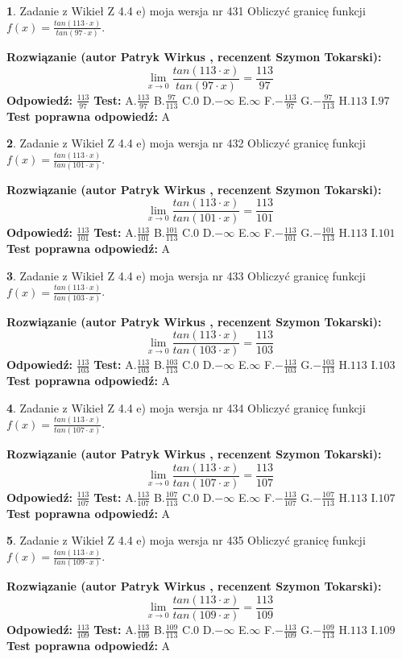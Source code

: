 \documentclass[12pt, a4paper]{article}
\theoremstyle{definition} %
\newtheorem{zad}{}
\newcommand{\zadStart}[1]{\begin{zad}#1\newline}
\newcommand{\zadStop}{\end{zad}}
\newcommand{\rozwStart}[2]{\noindent \textbf{Rozwiązanie (autor #1 , recenzent #2): }\newline}
\newcommand{\rozwStop}{\newline}
\newcommand{\odpStart}{\noindent \textbf{Odpowiedź:}\newline}
\newcommand{\odpStop}{\newline}
\newcommand{\testStart}{\noindent \textbf{Test:}\newline}
\newcommand{\testStop}{\newline}
\newcommand{\kluczStart}{\noindent \textbf{Test poprawna odpowiedź:}\newline}
\newcommand{\kluczStop}{\newline}
\begin{document}
\zadStart{Zadanie z Wikieł Z 4.4 e) moja wersja nr 431}
Obliczyć granicę funkcji $f(x)=\frac{tan(113\cdot x)}{tan(97\cdot x)}$.
\zadStop
\rozwStart{Patryk Wirkus}{Szymon Tokarski}
$$\lim\limits_{x\to 0}\frac{tan(113\cdot x)}{tan(97\cdot x)}=
\frac{113}{97}$$
\rozwStop
\odpStart
$\frac{113}{97}$
\odpStop
\testStart
A.$\frac{113}{97}$
B.$\frac{97}{113}$
C.$0$
D.$-\infty$
E.$\infty$
F.$-\frac{113}{97}$
G.$-\frac{97}{113}$
H.$113$
I.$97$
\testStop
\kluczStart
A
\kluczStop



\zadStart{Zadanie z Wikieł Z 4.4 e) moja wersja nr 432}
Obliczyć granicę funkcji $f(x)=\frac{tan(113\cdot x)}{tan(101\cdot x)}$.
\zadStop
\rozwStart{Patryk Wirkus}{Szymon Tokarski}
$$\lim\limits_{x\to 0}\frac{tan(113\cdot x)}{tan(101\cdot x)}=
\frac{113}{101}$$
\rozwStop
\odpStart
$\frac{113}{101}$
\odpStop
\testStart
A.$\frac{113}{101}$
B.$\frac{101}{113}$
C.$0$
D.$-\infty$
E.$\infty$
F.$-\frac{113}{101}$
G.$-\frac{101}{113}$
H.$113$
I.$101$
\testStop
\kluczStart
A
\kluczStop



\zadStart{Zadanie z Wikieł Z 4.4 e) moja wersja nr 433}
Obliczyć granicę funkcji $f(x)=\frac{tan(113\cdot x)}{tan(103\cdot x)}$.
\zadStop
\rozwStart{Patryk Wirkus}{Szymon Tokarski}
$$\lim\limits_{x\to 0}\frac{tan(113\cdot x)}{tan(103\cdot x)}=
\frac{113}{103}$$
\rozwStop
\odpStart
$\frac{113}{103}$
\odpStop
\testStart
A.$\frac{113}{103}$
B.$\frac{103}{113}$
C.$0$
D.$-\infty$
E.$\infty$
F.$-\frac{113}{103}$
G.$-\frac{103}{113}$
H.$113$
I.$103$
\testStop
\kluczStart
A
\kluczStop



\zadStart{Zadanie z Wikieł Z 4.4 e) moja wersja nr 434}
Obliczyć granicę funkcji $f(x)=\frac{tan(113\cdot x)}{tan(107\cdot x)}$.
\zadStop
\rozwStart{Patryk Wirkus}{Szymon Tokarski}
$$\lim\limits_{x\to 0}\frac{tan(113\cdot x)}{tan(107\cdot x)}=
\frac{113}{107}$$
\rozwStop
\odpStart
$\frac{113}{107}$
\odpStop
\testStart
A.$\frac{113}{107}$
B.$\frac{107}{113}$
C.$0$
D.$-\infty$
E.$\infty$
F.$-\frac{113}{107}$
G.$-\frac{107}{113}$
H.$113$
I.$107$
\testStop
\kluczStart
A
\kluczStop



\zadStart{Zadanie z Wikieł Z 4.4 e) moja wersja nr 435}
Obliczyć granicę funkcji $f(x)=\frac{tan(113\cdot x)}{tan(109\cdot x)}$.
\zadStop
\rozwStart{Patryk Wirkus}{Szymon Tokarski}
$$\lim\limits_{x\to 0}\frac{tan(113\cdot x)}{tan(109\cdot x)}=
\frac{113}{109}$$
\rozwStop
\odpStart
$\frac{113}{109}$
\odpStop
\testStart
A.$\frac{113}{109}$
B.$\frac{109}{113}$
C.$0$
D.$-\infty$
E.$\infty$
F.$-\frac{113}{109}$
G.$-\frac{109}{113}$
H.$113$
I.$109$
\testStop
\kluczStart
A
\kluczStop
\end{document}
